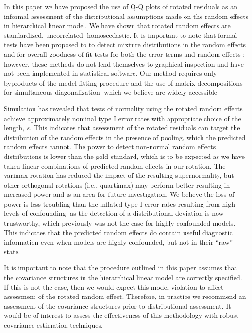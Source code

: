 \documentclass[12pt]{article} %
\newcommand{\hh}[1]{{\color{orange} #1}}
\begin{document}
In this paper we have proposed the use of Q-Q plots of rotated residuals as an informal assessment of the distributional assumptions made on the random effects in hierarchical linear model. We have shown that rotated random effects are standardized, uncorrelated, homoscedastic. It is important to note that formal tests have been proposed to to detect mixture distributions \citep{Verbeke:1996va} in the random effects and for overall goodness-of-fit tests for both the error terms and random effects \citep{Jiang:2001up}; however, these methods do \hh{not} lend themselves to graphical inspection and have not been implemented in statistical software. Our method requires only byproducts of the model fitting procedure and the use of matrix decompositions for simultaneous diagonalization, which we believe are widely accessible.

Simulation has revealed that tests of normality using the rotated random effects achieve approximately nominal type I error rates with appropriate choice of the length, $s$. This indicates that assessment of the rotated residuals can target the distribution of the random effects in the presence of pooling, which the predicted random effects cannot. The power to detect non-normal random effects distributions is lower than the gold standard, which is to be expected as we have taken linear combinations of predicted random effects in our rotation. The varimax rotation has reduced the impact of the resulting supernormality, but other orthogonal rotations (i.e., quartimax) may perform better resulting in increased power and is an area for future investigation. We believe the loss of power is less troubling than the inflated type I error rates resulting from high levels of confounding, as the detection of a distributional deviation is now trustworthy, which previously was not the case for highly confounded models. This indicates that the predicted random effects do contain useful diagnostic information even when models are highly confounded, but not in their ``raw'' state.
 
It is important to note that the procedure outlined in this paper assumes that the covariance structures in the hierarchical linear model are correctly specified. If this is not the case, then we would expect this model violation to affect assessment of the rotated random effect. Therefore, in practice we recommend an assessment of the covariance structures prior to distributional assessment. It would be of interest to assess the effectiveness of this methodology with robust covariance estimation techniques.
\end{document}
